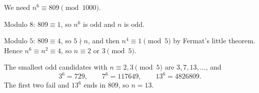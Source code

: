 We need $n^6\equiv809\pmod{1000}$.

Modulo $8$: $809\equiv1$, so $n^6$ is odd and $n$ is odd.

Modulo $5$: $809\equiv4$, so $5\nmid n$, and then $n^4\equiv1\pmod5$ by Fermat's little theorem. Hence $n^6\equiv n^2\equiv4$, so $n\equiv2$ or $3\pmod5$.

The smallest odd candidates with $n\equiv2,3\pmod5$ are $3,7,13,\ldots$, and
\[3^6=729,\qquad7^6=117649,\qquad13^6=4826809.\]
The first two fail and $13^6$ ends in $809$, so $n=\boxed{13}$.
